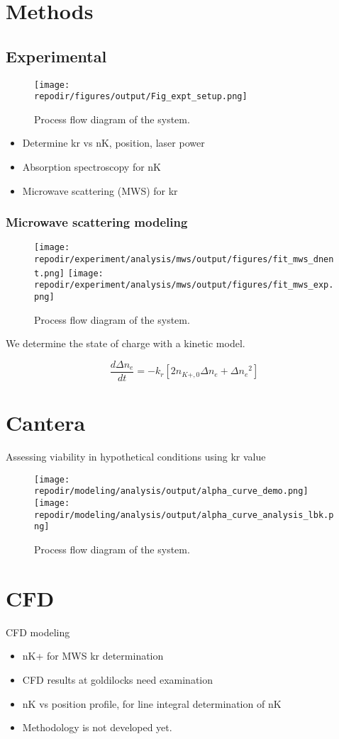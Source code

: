 \section{Methods}


\subsection{Experimental}

\begin{figure}[h]
    \texttt{[image: \\repodir/figures/output/Fig\_expt\_setup.png]} 
    \caption{Process flow diagram of the system.}
\end{figure}

\begin{itemize}
\item Determine kr vs nK, position, laser power
\item Absorption spectroscopy for nK
\item Microwave scattering (MWS) for kr 
\end{itemize}

\subsubsection{Microwave scattering modeling}

 

\begin{figure}[h]
    \texttt{[image: \\repodir/experiment/analysis/mws/output/figures/fit\_mws\_dnent.png]} 
    \texttt{[image: \\repodir/experiment/analysis/mws/output/figures/fit\_mws\_exp.png]} 
    \caption{Process flow diagram of the system.}
\end{figure}


We determine the state of charge with a kinetic model.

\begin{equation}
    \frac{d\Delta n_e}{dt} = - k_r [2 n_{K+,0}\Delta n_e + \Delta{n_e}^2]
\end{equation}

\section{Cantera}

Assessing viability in hypothetical conditions using kr value

\begin{figure}[h]
    \texttt{[image: \\repodir/modeling/analysis/output/alpha\_curve\_demo.png]} 
    \texttt{[image: \\repodir/modeling/analysis/output/alpha\_curve\_analysis\_lbk.png]} 
    \caption{Process flow diagram of the system.}
\end{figure}

\section{CFD}

CFD modeling 

\begin{itemize}
\item nK+ for MWS kr determination
\item CFD results at goldilocks need examination
\item nK vs position profile, for line integral determination of nK
\item Methodology is not developed yet. 
\end{itemize}
